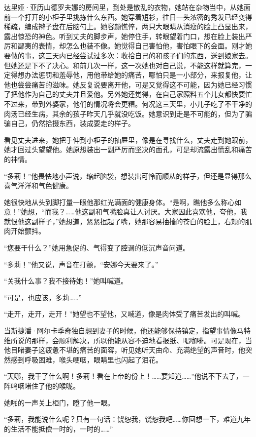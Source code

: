 \par 达里娅·亚历山德罗夫娜的房间里，到处是散乱的衣物，她站在杂物当中，从她面前一个打开的小柜子里挑拣什么东西。她穿着短衫，往日一头浓密的秀发已经变得稀疏，编成辫子盘在后脑勺上。她容颜憔悴，两只大眼睛从消瘦的脸上凸显出来，露出惊恐的神色。听到丈夫的脚步声，她停住手，转眼望着门口，想在脸上装出严厉和鄙夷的表情，却怎么也装不像。她觉得自己害怕他，害怕眼下的会面。刚才她要做的事，这三天内已经尝试过多次：收拾自己的和孩子们的东西，送到娘家去。但她还是下不了决心。和前几次一样，这一次她也对自己说，不能这样就算完，一定得想办法惩罚和羞辱他，用他带给她的痛苦，哪怕只是一小部分，来报复他，让他也尝尝痛苦的滋味。她反复说要离开他，可是又觉得这不可能，因为她已经习惯了把他作为自己的丈夫并且爱他。另外她还觉得，在自己家照料五个儿女都快要忙不过来，带到外婆家，他们的情况将会更糟。何况这三天里，小儿子吃了不干净的肉汤已经生病，其余的孩子昨天几乎就没吃饭。她意识到走是不可能的，但为了骗骗自己，仍然拾掇东西，装成要走的样子。
\par 看见丈夫进来，她把手伸到小柜子的抽屉里，像是在寻找什么，丈夫走到她跟前，她才回过头望望他。她原想装出一副严厉而坚决的面孔，可是却流露出慌乱和痛苦的神情。
\par “多莉！”他畏怯地小声说，缩起脑袋，想装出可怜而顺从的样子，但还是显得那么喜气洋洋和气色健康。
\par 她很快地从头到脚打量一眼他那红光满面的健康身体。“是啊，瞧他多么称心如意！”她想，“而我？……他这副和气嘴脸真让人讨厌。大家因此喜欢他，夸他，我就恨他这副样子，”她想道，紧紧抿起了嘴，她那容易抽搐的苍白的脸上，右颊的肌肉开始颤抖。
\par “您要干什么？”她用急促的、气得变了腔调的低沉声音问道。
\par “多莉！”他又说，声音在打颤，“安娜今天要来了。”
\par “关我什么事？我不接待她！”她叫喊道。
\par “可是，也应该，多莉……”
\par “走开，走开，走开！”她望也不望他，又喊道，像是肉体受了痛苦发出的叫喊。
\par 当斯捷潘·阿尔卡季奇独自想到妻子的时候，他还能够保持镇定，指望事情像马特维所说的那样，会顺利解决，所以他能从容不迫地看报纸、喝咖啡。可是现在，当他目睹妻子这疲惫不堪的痛苦的面容，听见她听天由命、充满绝望的声音时，他突然感到呼吸困难，喉头哽咽，眼睛里也闪起了泪花。
\par “天哪，我干了什么啊！多莉！看在上帝的份上！……要知道……”他说不下去了，一阵呜咽堵住了他的喉咙。
\par 她啪的一声关上柜门，瞪了他一眼。
\par “多莉，我能说什么呢？只有一句话：饶恕我，饶恕我吧……你回想一下，难道九年的生活不能抵偿一时的，一时的……”

